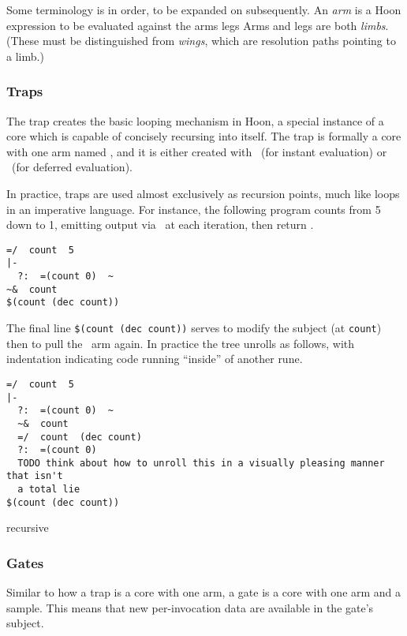Some terminology is in order, to be expanded on subsequently.  An \emph{arm} is a Hoon expression to be evaluated against the
arms
legs
Arms and legs are both \emph{limbs}.  (These must be distinguished from \emph{wings}, which are resolution paths pointing to a limb.)


\subsubsection{Traps}

The trap creates the basic looping mechanism in Hoon, a special instance of a core which is capable of concisely recursing into itself.  The trap is formally a core with one arm named \buc, and it is either created with \pbarhep~(for instant evaluation) or \pbardot~(for deferred evaluation).

In practice, traps are used almost exclusively as recursion points, much like loops in an imperative language.  For instance, the following program counts from 5 down to 1, emitting output via \psigpam~at each iteration, then return \sig.

\begin{lstlisting}[language=hoon,
                   style=nonumbers]
=/  count  5
|-
  ?:  =(count 0)  ~
~&  count
$(count (dec count))
\end{lstlisting}

The final line \texttt{\$(count (dec count))} serves to modify the subject (at \texttt{count}) then to pull the \buc~arm again.  In practice the tree unrolls as follows, with indentation indicating code running “inside” of another rune.

\begin{lstlisting}[language=hoon,
                   style=nonumbers]
=/  count  5
|-
  ?:  =(count 0)  ~
  ~&  count
  =/  count  (dec count)
  ?:  =(count 0)
  TODO think about how to unroll this in a visually pleasing manner that isn't
  a total lie
$(count (dec count))
\end{lstlisting}


recursive


\subsubsection{Gates}

Similar to how a trap is a core with one arm, a gate is a core with one arm and a sample.  This means that new per-invocation data are available in the gate's subject.


